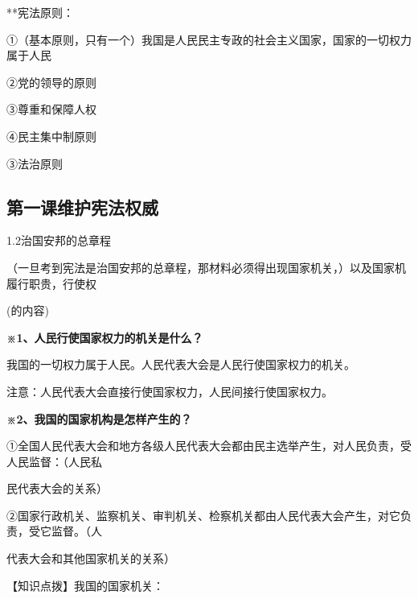 \documentclass[lang=cn,11pt]{elegantbook}
\newcommand{\daofasym}[1]{{\daofasymbolfont #1}}
\newcommand{\daofasym}[1]{#1}
\begin{document}
**宪法原则：\par

\daofasym{①}（基本原则，只有一个）我国是人民民主专政的社会主义国家，国家的一切权力属于人民\par

\daofasym{②}党的领导的原则\par

\daofasym{③}尊重和保障人权\par

\daofasym{④}民主集中制原则\par

\daofasym{③}法治原则\par

\subsection*{第一课维护宪法权威}

1.2治国安邦的总章程\par

（一旦考到宪法是治国安邦的总章程，那材料必须得出现国家机关，）以及国家机履行职贵，行使权\par

(的内容)\par

\textbf{※1、人民行使国家权力的机关是什么？}\par

我国的一切权力属于人民。人民代表大会是人民行使国家权力的机关。\par

注意：人民代表大会直接行使国家权力，人民间接行使国家权力。\par

\textbf{※2、我国的国家机构是怎样产生的？}\par

\daofasym{①}全国人民代表大会和地方各级人民代表大会都由民主选举产生，对人民负责，受人民监督：（人民私\par

民代表大会的关系）\par

\daofasym{②}国家行政机关、监察机关、审判机关、检察机关都由人民代表大会产生，对它负责，受它监督。（人\par

代表大会和其他国家机关的关系）\par

【知识点拨】我国的国家机关：\par
\end{document}
